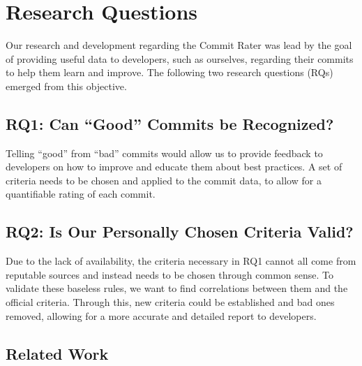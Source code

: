 \section{Research Questions}
\label{sec:research-questions}

Our research and development regarding the Commit Rater was lead by the goal of providing useful data to developers, such as ourselves, regarding their commits to help them learn and improve. The following two research questions (RQs) emerged from this objective.


\subsection{RQ1: Can ``Good'' Commits be Recognized?}
\label{sec:rq1}

Telling ``good'' from ``bad'' commits would allow us to provide feedback to developers on how to improve and educate them about best practices. A set of criteria needs to be chosen and applied to the commit data, to allow for a quantifiable rating of each commit.


\subsection{RQ2: Is Our Personally Chosen Criteria Valid?}
\label{sec:rq2}

Due to the lack of availability, the criteria necessary in RQ1 cannot all come from reputable sources and instead needs to be chosen through common sense. To validate these baseless rules, we want to find correlations between them and the official criteria. Through this, new criteria could be established and bad ones removed, allowing for a more accurate and detailed report to developers.


\subsection{Related Work}
\label{sec:related-work}

